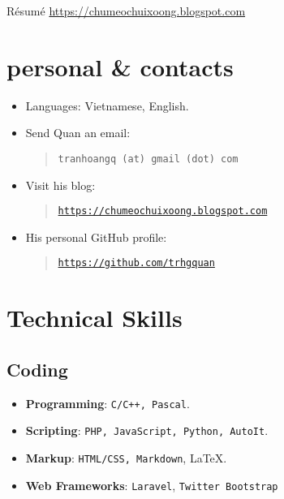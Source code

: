 \documentclass{article}
\renewcommand{\maketitle}{
    \begin{center}
        {\huge\bfseries\theauthor}
        \linebreak\linebreak
        R\'esum\'e
        \linebreak
        \url{https://chumeochuixoong.blogspot.com}
    \end{center}
}
\begin{document}
    \author{Quan, Tran Hoang}
    \maketitle

    \section{personal \& contacts}
        \begin{itemize}
            \item Languages: Vietnamese, English.
            \item Send Quan an email:
            \begin{quote}
                \texttt{tranhoangq (at) gmail (dot) com}
            \end{quote}
            \item Visit his blog:
            \begin{quote}
                \texttt{\url{https://chumeochuixoong.blogspot.com}}
            \end{quote}
            \item His personal GitHub profile:
            \begin{quote}
                \texttt{\url{https://github.com/trhgquan}}
            \end{quote}
        \end{itemize}

    \section{Technical Skills}
        \subsection{Coding}
        \begin{itemize}
            \item \textbf{Programming}: \texttt{C/C++, Pascal}.
            \item \textbf{Scripting}: \texttt{PHP, JavaScript, Python, AutoIt}.
            \item \textbf{Markup}: \texttt{HTML/CSS, Markdown}, \LaTeX.
            \item \textbf{Web Frameworks}: \texttt{Laravel}\cite{laravel}, \texttt{Twitter Bootstrap}\cite{bootstrap}
        \end{itemize}
\end{document}

